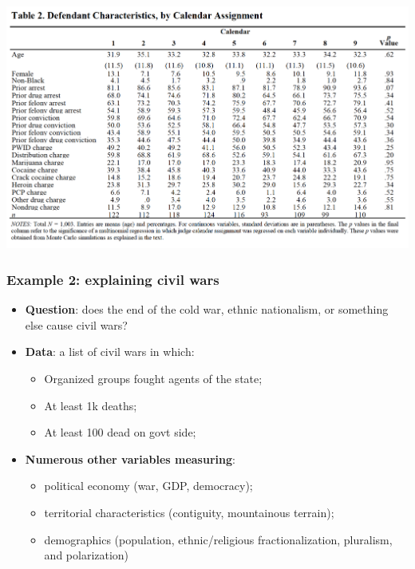 \documentclass[aspectratio=169]{beamer}
\theoremstyle{principle}
\begin{document}
\begin{frame}
\begin{center}
\includegraphics[scale=0.4]{random_judge_assignment.png}
\end{center}

\end{frame}

\begin{frame}
\frametitle{Example 2: explaining civil wars}

\begin{itemize}
\item \textbf{Question}: does the end of the cold war, ethnic nationalism, or something else cause civil wars?
\bigskip
\bigskip
\item \textbf{Data}: a list of civil wars in which:
\begin{itemize}
\item Organized groups fought agents of the state;
\item At least 1k deaths;
\item At least 100 dead on govt side;
\end{itemize}
\bigskip
\item \textbf{Numerous other variables measuring}:
\begin{itemize}
\item political economy (war, GDP, democracy);
\item territorial characteristics (contiguity, mountainous terrain);
\item demographics (population, ethnic/religious fractionalization, pluralism, and polarization)
\end{itemize}
\end{itemize}

\end{frame}
\end{document}
